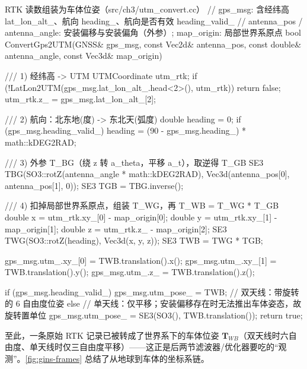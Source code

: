 \begin{codebox}[C++]{RTK 读数组装为车体位姿（src/ch3/utm\_convert.cc）}
// gps_msg: 含经纬高 lat_lon_alt_、航向 heading_、航向是否有效 heading_valid_
// antenna_pos / antenna_angle: 安装偏移与安装偏角（外参）; map_origin: 局部世界系原点
bool ConvertGps2UTM(GNSS& gps_msg, const Vec2d& antenna_pos, const double& antenna_angle,
                    const Vec3d& map_origin) {
  /// 1) 经纬高 -> UTM
  UTMCoordinate utm_rtk;
  if (!LatLon2UTM(gps_msg.lat_lon_alt_.head<2>(), utm_rtk)) return false;
  utm_rtk.z_ = gps_msg.lat_lon_alt_[2];

  /// 2) 航向：北东地(度) -> 东北天(弧度)
  double heading = 0;
  if (gps_msg.heading_valid_) heading = (90 - gps_msg.heading_) * math::kDEG2RAD;

  /// 3) 外参 T_BG（绕 z 转 a_theta，平移 a_t），取逆得 T_GB
  SE3 TBG(SO3::rotZ(antenna_angle * math::kDEG2RAD), Vec3d(antenna_pos[0], antenna_pos[1], 0));
  SE3 TGB = TBG.inverse();

  /// 4) 扣掉局部世界系原点，组装 T_WG，再 T_WB = T_WG * T_GB
  double x = utm_rtk.xy_[0] - map_origin[0];
  double y = utm_rtk.xy_[1] - map_origin[1];
  double z = utm_rtk.z_     - map_origin[2];
  SE3 TWG(SO3::rotZ(heading), Vec3d(x, y, z));
  SE3 TWB = TWG * TGB;

  gps_msg.utm_.xy_[0] = TWB.translation().x();
  gps_msg.utm_.xy_[1] = TWB.translation().y();
  gps_msg.utm_.z_     = TWB.translation().z();

  if (gps_msg.heading_valid_) {
    gps_msg.utm_pose_ = TWB;                           // 双天线：带旋转的 6 自由度位姿
  } else {
    // 单天线：仅平移；安装偏移存在时无法推出车体姿态，故旋转置单位
    gps_msg.utm_pose_ = SE3(SO3(), TWB.translation());
  }
  return true;
}
\end{codebox}

\noindent{}至此，一条原始 RTK 记录已被转成了世界系下的车体位姿 $\mathbf{T}_{WB}$（双天线时六自由度、单天线时仅三自由度平移）——这正是后两节滤波器/优化器要吃的“观测”。\cref{fig:gins-frames} 总结了从地球到车体的坐标系链。

